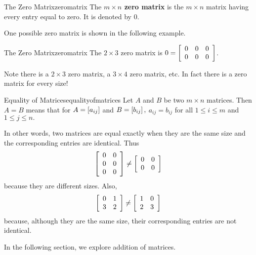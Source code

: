 \begin{definition}{The Zero Matrix}{zeromatrix}
The \textbf{$m\times n$ zero matrix} is the $m\times n$ matrix
having every entry equal to zero. It is
 denoted by $0.$
\end{definition}

One possible zero matrix is shown in the following example.

\begin{example}{The Zero Matrix}{zeromatrix}
The $2\times 3$ zero matrix is $0= \left[
\begin{array}{ccc}
0 & 0 & 0 \\
0 & 0 & 0
\end{array}
\right] $.
\end{example}

Note there is a $2\times 3$ zero matrix, a $3\times 4$ zero matrix, etc. In
fact there is a zero matrix for every size! 

\begin{definition}{Equality of Matrices}{equalityofmatrices}
 Let $A$ and $B$ be two $m \times n$ matrices. Then $A=B$  means
that for $A=\left[ a_{ij}\right] $
and $B=\left[ b_{ij}\right] ,$ $a_{ij}=b_{ij}$ for all $1\leq i\leq m$ and 
$1\leq j\leq n.$
\end{definition}

In other words, two matrices are equal exactly when they are the same size and the
corresponding entries are identical. Thus
\begin{equation*}
\left[
\begin{array}{rr}
0 & 0 \\
0 & 0 \\
0 & 0
\end{array}
\right] \neq \left[
\begin{array}{rr}
0 & 0 \\
0 & 0
\end{array}
\right]
\end{equation*}
because they are different sizes. 
Also,
\begin{equation*}
\left[
\begin{array}{rr}
0 & 1 \\
3 & 2 
\end{array}
\right] \neq \left[
\begin{array}{rr}
1 & 0 \\
2 & 3
\end{array}
\right]
\end{equation*}
because, although they are the same size, their corresponding entries are not identical.

In the following section, we explore addition of matrices. 
